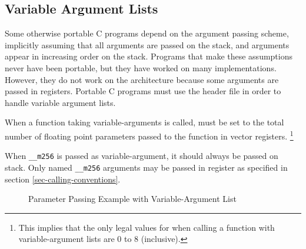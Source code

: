 \subsection{Variable Argument Lists}

Some otherwise portable C programs depend on the argument passing
scheme, implicitly assuming that all arguments are passed on the
stack, and arguments appear in increasing order on the stack.
Programs that make these assumptions never have been portable, but
they have worked on many implementations. However, they do not work on
the \xARCH architecture because some arguments are passed in
registers.  Portable C programs must use the header file
 in order to handle variable argument lists.

When a function taking variable-arguments is called, \RAX\index{\RAX}
must be set to the total number of floating point parameters passed to
the function in vector registers.%
\footnote{This implies that the only legal values for \RAX when
  calling a function with variable-argument lists are 0 to 8
  (inclusive).}

When \texttt{__m256} is passed as variable-argument, it should always
be passed on stack. Only named \texttt{__m256} arguments may be passed
in register as specified in section \ref{sec-calling-conventions}.

\begin{figure}[H]
\Hrule
\caption{Parameter Passing Example with Variable-Argument List}
\label{fig_va_passing_example}
\begin{center}
\end{center}
\Hrule
\end{figure}

